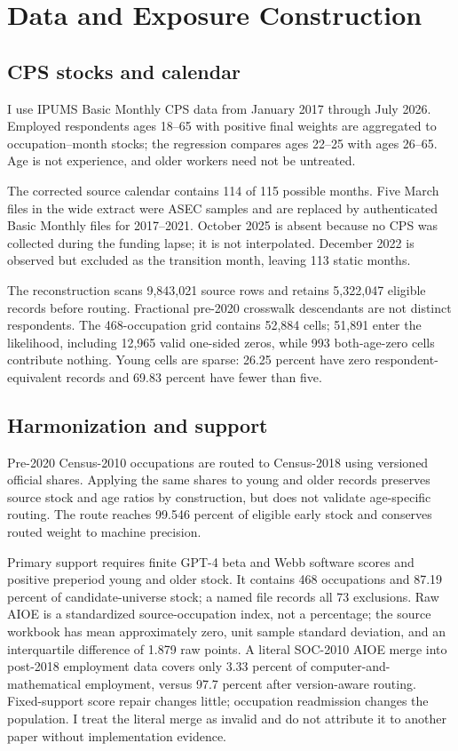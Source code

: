 \section{Data and Exposure Construction}\label{sec:data}

\subsection{CPS stocks and calendar}

I use IPUMS Basic Monthly CPS data from January 2017 through July 2026.  Employed respondents ages 18--65 with positive final weights are aggregated to occupation--month stocks; the regression compares ages 22--25 with ages 26--65.  Age is not experience, and older workers need not be untreated.

The corrected source calendar contains 114 of 115 possible months.  Five March files in the wide extract were ASEC samples and are replaced by authenticated Basic Monthly files for 2017--2021.  October 2025 is absent because no CPS was collected during the funding lapse; it is not interpolated.  December 2022 is observed but excluded as the transition month, leaving 113 static months.

The reconstruction scans 9,843,021 source rows and retains 5,322,047 eligible records before routing.  Fractional pre-2020 crosswalk descendants are not distinct respondents.  The 468-occupation grid contains 52,884 cells; 51,891 enter the likelihood, including 12,965 valid one-sided zeros, while 993 both-age-zero cells contribute nothing.  Young cells are sparse: 26.25 percent have zero respondent-equivalent records and 69.83 percent have fewer than five.



\subsection{Harmonization and support}

Pre-2020 Census-2010 occupations are routed to Census-2018 using versioned official shares.  Applying the same shares to young and older records preserves source stock and age ratios by construction, but does not validate age-specific routing.  The route reaches 99.546 percent of eligible early stock and conserves routed weight to machine precision.

Primary support requires finite GPT-4 beta and Webb software scores and positive preperiod young and older stock.  It contains 468 occupations and 87.19 percent of candidate-universe stock; a named file records all 73 exclusions.  Raw AIOE is a standardized source-occupation index, not a percentage; the source workbook has mean approximately zero, unit sample standard deviation, and an interquartile difference of 1.879 raw points.  A literal SOC-2010 AIOE merge into post-2018 employment data covers only 3.33 percent of computer-and-mathematical employment, versus 97.7 percent after version-aware routing.  Fixed-support score repair changes little; occupation readmission changes the population.  I treat the literal merge as invalid and do not attribute it to another paper without implementation evidence.

